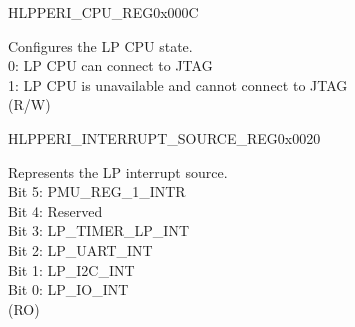 \begin{register}{H}{LPPERI\_CPU\_REG}{0x000C}\label{regdesc:LPPERICPUREG}
%
%
\regnewline%
\begin{regdesc}\begin{reglist}
\label{fielddesc:LPPERILPCOREDBGMUNAVALIABLE}\item [LPPERI\_LPCORE\_DBGM\_UNAVALIABLE] Configures the LP CPU state.\\
0: LP CPU can connect to JTAG\\
1: LP CPU is unavailable and cannot connect to JTAG\\
(R/W)
\end{reglist}\end{regdesc}
\end{register}


\begin{register}{H}{LPPERI\_INTERRUPT\_SOURCE\_REG}{0x0020}\label{regdesc:LPPERIINTERRUPTSOURCEREG}
%
%
\regnewline%
\begin{regdesc}\begin{reglist}
\label{fielddesc:LPPERILPINTERRUPTSOURCE}\item [LPPERI\_LP\_INTERRUPT\_SOURCE] Represents the LP interrupt source.\\
Bit 5: PMU\_REG\_1\_INTR\\
Bit 4: Reserved\\
Bit 3: LP\_TIMER\_LP\_INT\\
Bit 2: LP\_UART\_INT\\
Bit 1: LP\_I2C\_INT\\
Bit 0: LP\_IO\_INT\\
(RO)
\end{reglist}\end{regdesc}
\end{register}